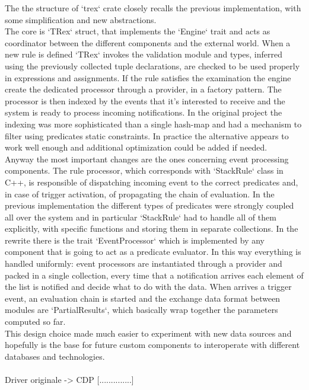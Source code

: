 The the structure of `trex` crate closely recalls the previous implementation, with some simplification and new abstractions.\\
The core is `TRex` struct, that implements the `Engine` trait and acts as coordinator between the different components and the external world. When a new rule is defined `TRex` invokes the validation module and types, inferred using the previously collected tuple declarations, are checked to be used properly in expressions and assignments. If the rule satisfies the examination the engine create the dedicated processor through a provider, in a factory pattern. The processor is then indexed by the events that it's interested to receive and the system is ready to process incoming notifications. In the original project the indexing was more sophisticated than a single hash-map and had a mechanism to filter using predicates static constraints. In practice the alternative appears to work well enough and additional optimization could be added if needed.\\
Anyway the most important changes are the ones concerning event processing components. The rule processor, which corresponds with `StackRule` class in C++, is responsible of dispatching incoming event to the correct predicates and, in case of trigger activation, of propagating the chain of evaluation. In the previous implementation the different types of predicates were strongly coupled all over the system and in particular `StackRule` had to handle all of them explicitly, with specific functions and storing them in separate collections. In the rewrite there is the trait `EventProcessor` which is implemented by any component that is going to act as a predicate evaluator. In this way everything is handled uniformly: event processors are instantiated through a provider and packed in a single collection, every time that a notification arrives each element of the list is notified and decide what to do with the data. When arrives a trigger event, an evaluation chain is started and the exchange data format between modules are `PartialResults`, which basically wrap together the parameters computed so far.\\
This design choice made much easier to experiment with new data sources and hopefully is the base for future custom components to interoperate with different databases and technologies.
\\
\\

Driver originale -> CDP [..............]

